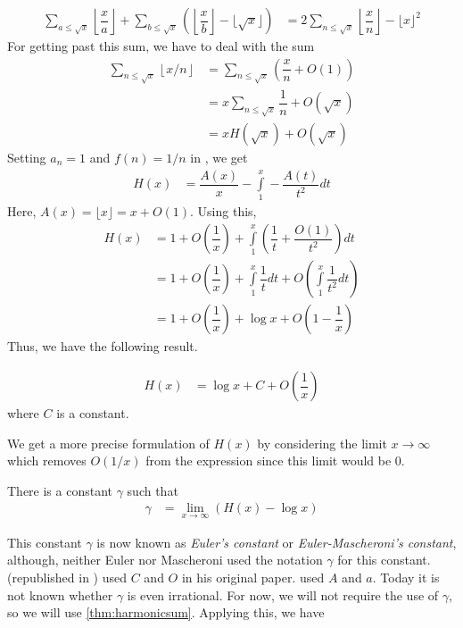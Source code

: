 \documentclass[elemannt.tex]{subfile}
\begin{document}
		\begin{align}
			\sum_{a\leq \sqrt{x}}\left\lfloor{\dfrac{x}{a}}\right\rfloor+\sum_{b\leq \sqrt{x}}\left(\left\lfloor{\dfrac{x}{b}}\right\rfloor-\lfloor{\sqrt{x}}\rfloor\right)
				& = 2\sum_{n\leq \sqrt{x}}\left\lfloor{\dfrac{x}{n}}\right\rfloor-\lfloor{x}\rfloor^{2}\label{eqn:totdiv}
		\end{align}
	For getting past this sum, we have to deal with the sum
		\begin{align*}
			\sum_{n\leq \sqrt{x}}\left\lfloor{x/n}\right\rfloor
				& = \sum_{n\leq \sqrt{x}}\left(\dfrac{x}{n}+O(1)\right)\\
				& = x\sum_{n\leq \sqrt{x}}\dfrac{1}{n}+O(\sqrt{x})\\
				& = xH(\sqrt{x})+O(\sqrt{x})
		\end{align*}
	Setting $a_{n}=1$ and $f(n)=1/n$ in , we get
		\begin{align*}
			H(x)
				& = \dfrac{A(x)}{x}-\int\limits_{1}^{x}-\dfrac{A(t)}{t^{2}}dt
		\end{align*}
	Here, $A(x)=\lfloor{x}\rfloor=x+O(1)$. Using this,
		\begin{align*}
			H(x)
				& =  1+O\left(\dfrac{1}{x}\right)+\int\limits_{1}^{x}\left(\dfrac{1}{t}+\dfrac{O(1)}{t^{2}}\right)dt\\
				& = 1+O\left(\dfrac{1}{x}\right)+\int\limits_{1}^{x}\dfrac{1}{t}dt+O\left(\int\limits_{1}^{x}\dfrac{1}{t^{2}}dt\right)\\
				& = 1+O\left(\dfrac{1}{x}\right)+\log{x}+O\left(1-\dfrac{1}{x}\right)
		\end{align*}
	Thus, we have the following result.
		\begin{theorem}\label{thm:harmonicsum}
				\begin{align*}
					H(x)
						& = \log{x}+C+O\left(\dfrac{1}{x}\right)
				\end{align*}
			where $C$ is a constant.
		\end{theorem}
	We get a more precise formulation of $H(x)$ by considering the limit $x\to\infty$ which removes $O(1/x)$ from the expression since this limit would be $0$.
		\begin{theorem}
			There is a constant $\gamma$ such that
				\begin{align*}
					\gamma
						& = \lim\limits_{x\to\infty}(H(x)-\log{x})
				\end{align*}
		\end{theorem}
	This constant $\gamma$ is now known as \textit{Euler's constant} or \textit{Euler-Mascheroni's constant}, although, neither Euler nor Mascheroni used the notation $\gamma$ for this constant. \textcite{euler_1740} (republished in \textcite{euler_2020}) used $C$ and $O$ in his original paper. \textcite{mascheroni_1790} used $A$ and $a$. Today it is not known whether $\gamma$ is even irrational. For now, we will not require the use of $\gamma$, so we will use \autoref{thm:harmonicsum}. Applying this, we have
\end{document}
